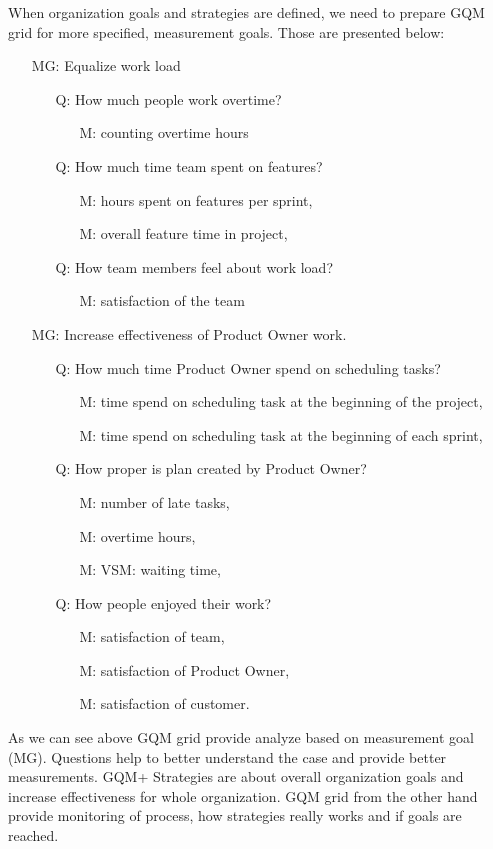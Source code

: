 When organization goals and strategies are defined, we need to prepare GQM grid for more specified, measurement goals. Those are presented below:
\begin{itemize}
\item[MG:] Equalize work load
	\begin{itemize}
	\item[Q:] How much people work overtime?
    	\begin{itemize}
    	\item[M:] counting overtime hours
    	\end{itemize}
    \item[Q:] How much time team spent on features?
    	\begin{itemize}
    	\item[M:] hours spent on features per sprint,
        \item[M:] overall feature time in project,
    	\end{itemize}
    \item[Q:] How team members feel about work load?
    	\begin{itemize}
    	\item[M:] satisfaction of the team
    	\end{itemize}
	\end{itemize}
\item[MG:] Increase effectiveness of Product Owner work.
	\begin{itemize}
	\item[Q:] How much time Product Owner spend on scheduling tasks?
    	\begin{itemize}
    	\item[M:] time spend on scheduling task at the beginning of the project,
        \item[M:] time spend on scheduling task at the beginning of each sprint,
    	\end{itemize}
    \item[Q:] How proper is plan created by Product Owner?
    	\begin{itemize}
    	\item[M:] number of late tasks,
        \item[M:] overtime hours,
        \item[M:] VSM: waiting time,
    	\end{itemize}
    \item[Q:] How people enjoyed their work?
    	\begin{itemize}
    	\item[M:] satisfaction of team,
        \item[M:] satisfaction of Product Owner,
        \item[M:] satisfaction of customer.
    	\end{itemize}
	\end{itemize}
\end{itemize}

As we can see above GQM grid provide analyze based on measurement goal (MG). Questions help to better understand the case and provide better measurements. GQM+ Strategies are about  overall organization goals and increase effectiveness for whole organization. GQM grid from the other hand provide monitoring of process, how strategies really works and if goals are reached.